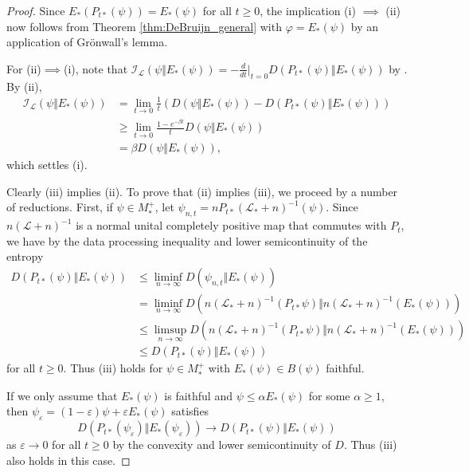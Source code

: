 \documentclass[12pt,a4paper]{amsart}
\newcommand{\1}{\mathds{1}}
\renewcommand{\epsilon}{\varepsilon}
\renewcommand{\phi}{\varphi}
\newcommand{\I}{\mathcal I}
\renewcommand{\L}{\mathcal L}
\theoremstyle{plain}
\theoremstyle{definition}
\theoremstyle{remark}
\begin{document}
\begin{proof}
Since $E_\ast(P_{t\ast}(\psi))=E_\ast(\psi)$ for all $t\geq 0$, the implication  (i) $\implies$ (ii) now follows from Theorem \ref{thm:DeBruijn_general} with $\phi=E_\ast(\psi)$ by an application of Grönwall's lemma.

For (ii)$\implies$(i), note that $\I_\L(\psi\Vert E_\ast(\psi))=-\frac{d}{dt}|_{t=0}D(P_{t\ast}(\psi)\Vert E_\ast(\psi))$ by . By (ii),
\begin{align*}
    \I_\L(\psi\Vert E_\ast(\psi))&=\lim_{t\to 0}\frac 1 t(D(\psi\Vert E_\ast(\psi))-D(P_{t\ast}(\psi)\Vert E_\ast(\psi)))\\
    &\geq \lim_{t\to 0}\frac {1-e^{-\beta t}}{t}D(\psi\Vert E_\ast(\psi))\\
    &=\beta D(\psi\Vert E_\ast(\psi)),
\end{align*}
which settles (i).

Clearly (iii) implies (ii). To prove that (ii) implies (iii), we proceed by a number of reductions. First, if $\psi\in M_\ast^+$, let $\psi_{n,t}=n P_{t\ast}(\L_\ast+n)^{-1}(\psi)$. Since $n(\L+n)^{-1}$ is a normal unital completely positive map that commutes with $P_t$, we have by the data processing inequality and lower semicontinuity of the entropy
\begin{align*}
D(P_{t\ast}(\psi)\Vert E_\ast(\psi))&\leq \liminf_{n\to\infty}D(\psi_{n,t}\Vert E_\ast(\psi))\\
&=\liminf_{n\to\infty}D(n(\L_\ast+n)^{-1}(P_{t\ast}\psi)\Vert n(\L_\ast+n)^{-1}(E_\ast(\psi)))\\
&\leq\limsup_{n\to\infty}D(n(\L_\ast+n)^{-1}(P_{t\ast}\psi)\Vert n(\L_\ast+n)^{-1}(E_\ast(\psi)))\\
&\leq D(P_{t\ast}(\psi)\Vert E_\ast(\psi))
\end{align*}
for all $t\geq 0$. Thus (iii) holds for $\psi\in M_\ast^+$ with $E_\ast(\psi)\in B(\psi)$ faithful.

If we only assume that $E_\ast(\psi)$ is faithful and $\psi\leq \alpha E_\ast(\psi)$ for some $\alpha\geq 1$, then $\psi_\epsilon=(1-\epsilon)\psi+\epsilon E_\ast(\psi)$ satisfies
\begin{equation*}
D(P_{t\ast}(\psi_\epsilon)\Vert E_\ast(\psi_\epsilon))\to D(P_{t\ast}(\psi)\Vert E_\ast(\psi))
\end{equation*}
as $\epsilon\to 0$ for all $t\geq 0$ by the convexity and lower semicontinuity of $D$. Thus (iii) also holds in this case.


\end{proof}
\end{document}

